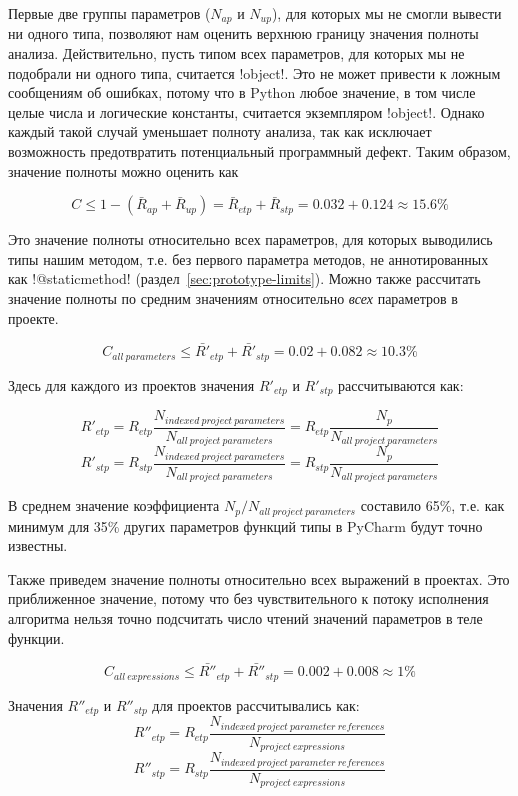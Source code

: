 Первые две группы параметров ($N_{ap}$ и $N_{up}$), для которых мы не смогли
вывести ни одного типа, позволяют нам оценить верхнюю границу значения полноты
анализа. Действительно, пусть типом всех параметров, для которых мы не подобрали
ни одного типа, считается !object!. Это не может привести к ложным сообщениям об
ошибках, потому что в Python любое значение, в том числе целые числа и
логические константы, считается экземпляром !object!. Однако каждый такой случай
уменьшает полноту анализа, так как исключает возможность предотвратить
потенциальный программный дефект. Таким образом, значение полноты можно оценить
как

\[
  C \le 1 - (\bar{R}_{ap} + \bar{R}_{up}) = \bar{R}_{etp} +
  \bar{R}_{stp} = 0.032 + 0.124 \approx 15.6\%
\]

Это значение полноты относительно всех параметров, для которых выводились типы
нашим методом, т.е. без первого параметра методов, не аннотированных как
!@staticmethod! (раздел~\ref{sec:prototype-limits}). Можно также рассчитать
значение полноты по средним значениям относительно \emph{всех} параметров в
проекте.

\[
  C_{all~parameters} \le \bar{R'}_{etp} + \bar{R'}_{stp} = 0.02 + 0.082 \approx 10.3\% 
\]

Здесь для каждого из проектов значения $R'_{etp}$ и $R'_{stp}$ рассчитываются
как:

\[
  R'_{etp} = R_{etp}
  \frac{N_{indexed~project~parameters}}{N_{all~project~parameters}} = R_{etp}
  \frac{N_p}{N_{all~project~parameters}}
\]
\[
  R'_{stp} = R_{stp}
  \frac{N_{indexed~project~parameters}}{N_{all~project~parameters}} = R_{stp}
  \frac{N_p}{N_{all~project~parameters}}
\]

В среднем значение коэффициента $N_p / N_{all~project~parameters}$ составило
65\%, т.е. как минимум для 35\% других параметров функций типы в PyCharm будут
точно известны.

Также приведем значение полноты относительно всех выражений в проектах. Это
приближенное значение, потому что без чувствительного к потоку исполнения
алгоритма нельзя точно подсчитать число чтений значений параметров в
теле функции.

\[
  C_{all~expressions} \le \bar{R''}_{etp} + \bar{R''}_{stp} = 0.002
  + 0.008 \approx 1\% 
\]

Значения $R''_{etp}$ и $R''_{stp}$ для проектов рассчитывались как:
\[
  R''_{etp} = R_{etp}
  \frac{N_{indexed~project~parameter~references}}{N_{project~expressions}}
\]
\[
  R''_{stp} = R_{stp}
  \frac{N_{indexed~project~parameter~references}}{N_{project~expressions}}
\]

